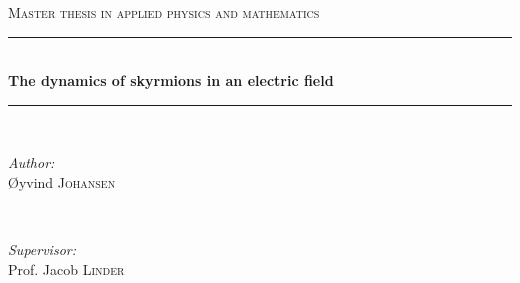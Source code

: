 \documentclass[12pt, a4paper, twoside, openright]{article}		%
\numberwithin{equation}{section}
\begin{document}
\begin{titlepage}

\newcommand{\HRule}{\rule{\linewidth}{0.5mm}} %

\center %
 

\textsc{\Large Master thesis in applied physics and mathematics}\\[0.5cm] %


\HRule \\[0.4cm]
{ \huge \bfseries The dynamics of skyrmions in an electric field}\\[0.4cm] %
\HRule \\[1.5cm]
 

\begin{minipage}{0.4\textwidth}
\begin{flushleft} \large
\emph{Author:}\\
\O yvind \textsc{Johansen} %
\end{flushleft}
\end{minipage}
~
\begin{minipage}{0.4\textwidth}
\begin{flushright} \large
\emph{Supervisor:} \\
Prof. Jacob \textsc{Linder} %
\end{flushright}
\end{minipage}\\[4cm]


\end{titlepage}
\end{document}

